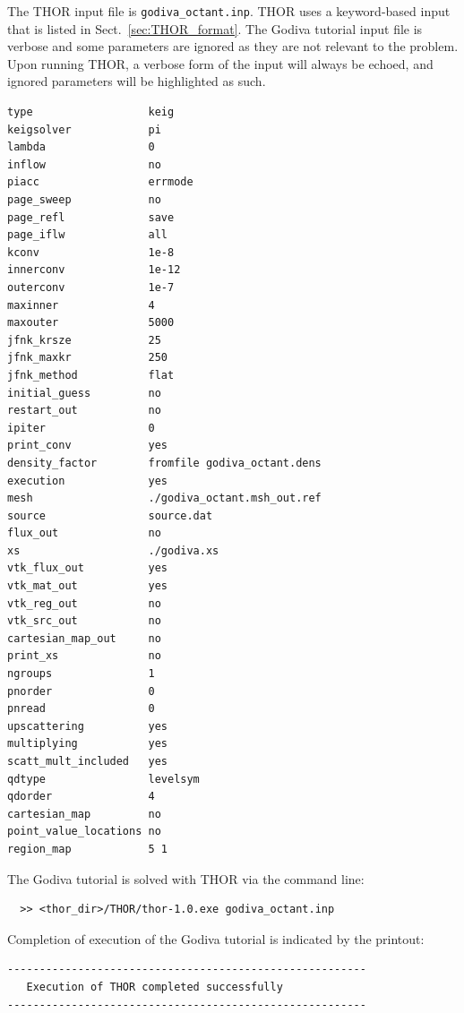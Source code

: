 The THOR input file is \verb"godiva_octant.inp".
THOR uses a keyword-based input that is listed in Sect.~\ref{sec:THOR_format}.
The Godiva tutorial input file is verbose and some parameters are ignored as they are not relevant to the problem.
Upon running THOR, a verbose form of the input will always be echoed, and ignored parameters will be highlighted as such.
\begin{verbatim}
type                  keig
keigsolver            pi
lambda                0
inflow                no
piacc                 errmode
page_sweep            no
page_refl             save
page_iflw             all
kconv                 1e-8
innerconv             1e-12
outerconv             1e-7
maxinner              4
maxouter              5000
jfnk_krsze            25
jfnk_maxkr            250
jfnk_method           flat
initial_guess         no
restart_out           no
ipiter                0
print_conv            yes
density_factor        fromfile godiva_octant.dens
execution             yes
mesh                  ./godiva_octant.msh_out.ref
source                source.dat
flux_out              no
xs                    ./godiva.xs
vtk_flux_out          yes
vtk_mat_out           yes
vtk_reg_out           no
vtk_src_out           no
cartesian_map_out     no
print_xs              no
ngroups               1
pnorder               0
pnread                0
upscattering          yes
multiplying           yes
scatt_mult_included   yes
qdtype                levelsym
qdorder               4
cartesian_map         no
point_value_locations no
region_map            5 1
\end{verbatim}

The Godiva tutorial is solved with THOR via the command line:
\begin{verbatim}
  >> <thor_dir>/THOR/thor-1.0.exe godiva_octant.inp
\end{verbatim}

Completion of execution of the Godiva tutorial is indicated by the printout:
\begin{verbatim}
--------------------------------------------------------
   Execution of THOR completed successfully
--------------------------------------------------------
\end{verbatim}

